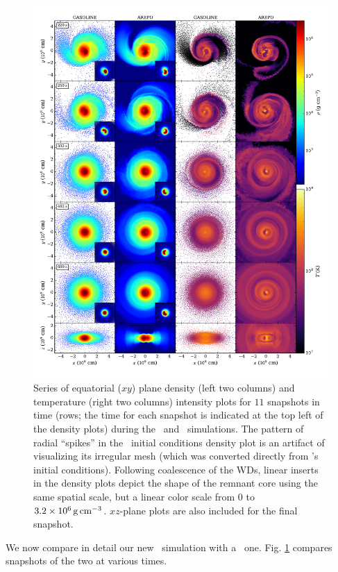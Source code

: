 \begin{figure}
\centering
\includegraphics[angle=0,width=1.0\columnwidth]{chapter3_zhu+u/figures/snapshots2.pdf}
\caption{Series of equatorial ($xy$) plane density (left two columns) and temperature (right two columns) intensity plots for $11$ snapshots in time (rows; the time for each snapshot is indicated at the top left of the density plots) during the \gasoline\ and \arepo\ simulations.  The pattern of radial ``spikes'' in the \arepo\ initial conditions density plot is an artifact of visualizing its irregular mesh (which was converted directly from \gasoline's initial conditions).  Following coalescence of the WDs, linear inserts in the density plots depict the shape of the remnant core using the same spatial scale, but a linear color scale from $0$ to $3.2\times10^6\,\gcc$.  $xz$-plane plots are also included for the final snapshot.}
\label{fig:c3_diagslice}
\end{figure}

We now compare in detail our new \arepo\ simulation with a \gasoline\ one.  Fig. \ref{fig:c3_diagslice} compares snapshots of the two at various times.

